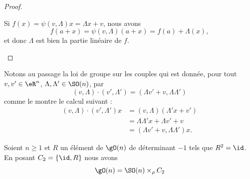 \begin{proof}
\begin{subproof}
		Si \( f(x)=\psi(v,\Lambda)x=\Lambda x+v\), nous avons
		\begin{equation}
			f(a+x)=\psi(v,\Lambda)(a+x)=f(a)+\Lambda(x),
		\end{equation}
		et donc \( \Lambda\) est bien la partie linéaire de \( f\).
	\end{subproof}
\end{proof}

\begin{remark}      \label{REMooLUEZooIwvTqu}
	Notons au passage la loi de groupe sur les couples qui est donnée, pour tout \( v,v'\in \eR^n\), \( \Lambda,\Lambda'\in\SO(n)\), par
	\begin{equation}    \label{EqDiHcut}
		(v,\Lambda)\cdot(v',\Lambda')=(\Lambda v'+v,\Lambda\Lambda')
	\end{equation}
	comme le montre le calcul suivant :
	\begin{subequations}
		\begin{align}
			(v,\Lambda)\cdot(v',\Lambda')x & =(v,\Lambda)(\Lambda'x+v')        \\
			                               & =\Lambda\Lambda'x+\Lambda v'+v    \\
			                               & =(\Lambda v'+v,\Lambda\Lambda')x.
		\end{align}
	\end{subequations}
\end{remark}

\begin{proposition}      \label{PROPooDHYWooXxEXvl}
	Soient \( n\geq 1\) et \( R\) un élément de \( \gO(n)\) de déterminant \( -1\) tels que \( R^2=\id\). En posant \( C_2=\{ \id,R \}\) nous avons
	\begin{equation}
		\gO(n)=\SO(n)\times_{\rho} C_2
	\end{equation}
\end{proposition}

